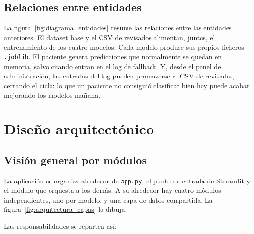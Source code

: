 \subsection*{Relaciones entre entidades}

La figura~\ref{fig:diagrama_entidades} resume las relaciones entre las entidades anteriores. El dataset base y el CSV de revisados alimentan, juntos, el entrenamiento de los cuatro modelos. Cada modelo produce sus propios ficheros \texttt{.joblib}. El paciente genera predicciones que normalmente se quedan en memoria, salvo cuando entran en el log de fallback. Y, desde el panel de administración, las entradas del log pueden promoverse al CSV de revisados, cerrando el ciclo: lo que un paciente no consiguió clasificar bien hoy puede acabar mejorando los modelos mañana.


\section{Diseño arquitectónico}

\subsection*{Visión general por módulos}

La aplicación se organiza alrededor de \texttt{app.py}, el punto de entrada de Streamlit y el módulo que orquesta a los demás. A su alrededor hay cuatro módulos independientes, uno por modelo, y una capa de datos compartida. La figura~\ref{fig:arquitectura_capas} lo dibuja.


Las responsabilidades se reparten así:

